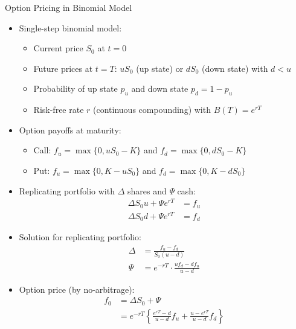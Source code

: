 \documentclass[10pt]{beamer}
\begin{document}
\begin{frame}{Option Pricing in Binomial Model}
  \begin{itemize}[<+->]
    \item Single-step binomial model:
      \begin{itemize}
        \item Current price $S_0$ at $t=0$
        \item Future prices at $t=T$: $uS_0$ (up state) or $dS_0$ (down state) with $d < u$
        \item Probability of up state $p_u$ and down state $p_d = 1-p_u$
        \item Risk-free rate $r$ (continuous compounding) with $B(T) = e^{rT}$
      \end{itemize}
      
    \item Option payoffs at maturity:
      \begin{itemize}
        \item Call: $f_u = \max\{0, uS_0-K\}$ and $f_d = \max\{0, dS_0-K\}$
        \item Put: $f_u = \max\{0, K-uS_0\}$ and $f_d = \max\{0, K-dS_0\}$
      \end{itemize}
      
    \item Replicating portfolio with $\Delta$ shares and $\Psi$ cash:
      \begin{align*}
        \Delta S_0u + \Psi e^{rT} &= f_u\\
        \Delta S_0d + \Psi e^{rT} &= f_d
      \end{align*}
      
    \item Solution for replicating portfolio:
      \begin{align*}
        \Delta &= \tfrac{f_u - f_d}{S_0(u - d)}\\
        \Psi &= e^{-rT} \cdot \tfrac{uf_d - df_u}{u - d}
      \end{align*}
      
    \item Option price (by no-arbitrage):
      \begin{align*}
        f_0 &= \Delta S_0 + \Psi\\
        &= e^{-rT} \left\{ \tfrac{e^{rT} - d}{u - d}f_u + \tfrac{u - e^{rT}}{u - d}f_d \right\}
      \end{align*}
  \end{itemize}
\end{frame}
\end{document}
